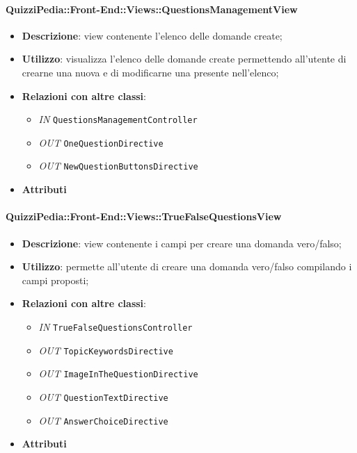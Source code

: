\paragraph{QuizziPedia::Front-End::Views::QuestionsManagementView}
\begin{itemize}
	\item \textbf{Descrizione}: view contenente l'elenco delle domande create; 
	\item \textbf{Utilizzo}: visualizza l'elenco delle domande create permettendo all'utente di crearne una nuova e di modificarne una presente nell'elenco;
	\item \textbf{Relazioni con altre classi}:
	\begin{itemize}
		\item \textit{IN} \texttt{QuestionsManagementController} \\
		\item \textit{OUT} \texttt{OneQuestionDirective} \\
		\item \textit{OUT} \texttt{NewQuestionButtonsDirective} \\ 
	\end{itemize}
	\item \textbf{Attributi}
\end{itemize}

\paragraph{QuizziPedia::Front-End::Views::TrueFalseQuestionsView}
\begin{itemize}
	\item \textbf{Descrizione}: view contenente i campi per creare una domanda vero/falso; 
	\item \textbf{Utilizzo}: permette all'utente di creare una domanda vero/falso compilando i campi proposti;
	\item \textbf{Relazioni con altre classi}:
	\begin{itemize}
		\item \textit{IN} \texttt{TrueFalseQuestionsController} \\
		\item \textit{OUT} \texttt{TopicKeywordsDirective} \\
		\item \textit{OUT} \texttt{ImageInTheQuestionDirective} \\
		\item \textit{OUT} \texttt{QuestionTextDirective} \\
		\item \textit{OUT} \texttt{AnswerChoiceDirective} \\   
	\end{itemize}
\item \textbf{Attributi}
\end{itemize}

